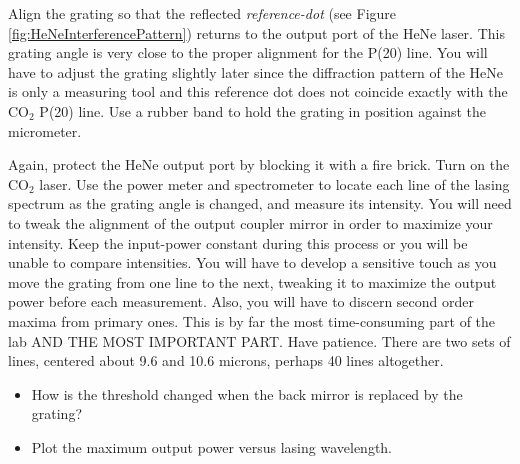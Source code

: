\documentclass{../lab}
\begin{document}
\begin{enumerate}
    Align the grating so that the reflected \emph{reference-dot} (see Figure \ref{fig:HeNeInterferencePattern}) returns to the output port of the HeNe laser. This grating angle is very close to the proper alignment for the P(20) line. You will have to adjust the grating slightly later since the diffraction pattern of the HeNe is only a measuring tool and this reference dot does not coincide exactly with the CO$_2$ P(20) line. Use a rubber band to hold the grating in position against the micrometer.
    
    
    
    Again, protect the HeNe output port by blocking it with a fire brick. Turn on the CO$_2$ laser. Use the power meter and spectrometer to locate each line of the lasing spectrum as the grating angle is changed, and measure its intensity. You will need to tweak the alignment of the output coupler mirror in order to maximize your intensity. Keep the input-power constant during this process or you will be unable to compare intensities. You will have to develop a sensitive touch as you move the grating from one line to the next, tweaking it to maximize the output power before each measurement. Also, you will have to discern second order maxima from primary ones. This is by far the most time-consuming part of the lab AND THE MOST IMPORTANT PART. Have patience. There are two sets of lines, centered about 9.6 and 10.6 microns, perhaps 40 lines altogether.

    
    
    \begin{itemize}
        \item How is the threshold changed when the back mirror is replaced by the grating?
    
        \item Plot the maximum output power versus lasing wavelength.

        
    
    \end{itemize}
    

\end{enumerate}
\end{document}
